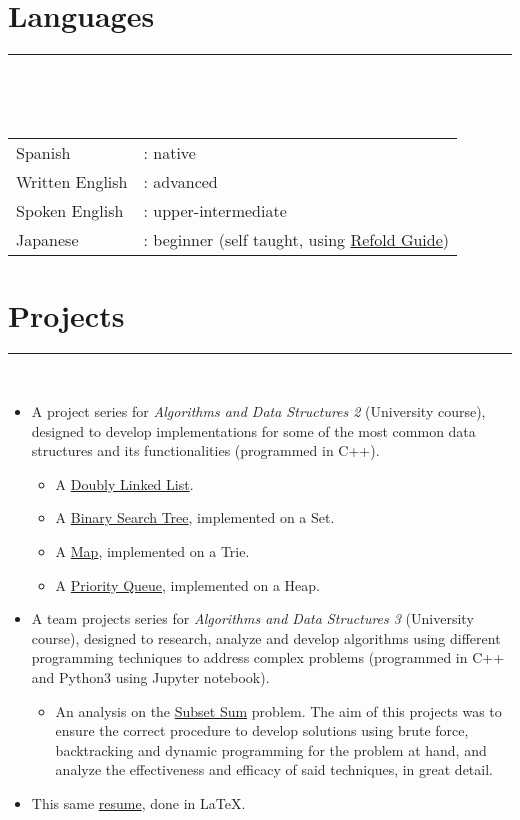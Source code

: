 \documentclass{article}
\begin{document}
\section*{Languages}
\hrule
\

\

\begin{tabular}{l l}
    Spanish & : native \\
    Written English & : advanced \\
    Spoken English & : upper-intermediate \\
    Japanese & : beginner (self taught, using \href{https://refold.la/}{Refold Guide})
\end{tabular}

\section*{Projects}
\hrule
\

\begin{itemize}
    \item A project series for \textit{Algorithms and Data Structures 2} (University course), designed to develop implementations for some of the most common data structures and its functionalities (programmed in C++).
    \begin{itemize}
        \item A \href{https://github.com/lucasDS-0/Doubly_Linked_List}{Doubly Linked List}.
        \item A \href{https://github.com/lucasDS-0/BST_on_a_set}{Binary Search Tree}, implemented on a Set.
        \item A \href{https://github.com/lucasDS-0/Map_on_a_trie}{Map}, implemented on a Trie.
        \item A \href{https://github.com/lucasDS-0/Priority_queue_on_a_heap}{Priority Queue}, implemented on a Heap.
    \end{itemize}
    \item A team projects series for \textit{Algorithms and Data Structures 3} (University course), designed to research, analyze and develop algorithms using different programming techniques to address complex problems (programmed in C++ and Python3 using Jupyter notebook).
    \begin{itemize}
        \item An analysis on the \href{https://github.com/lucasDS-0/Subset_sum}{Subset Sum} problem. The aim of this projects was to ensure the correct procedure to develop solutions using brute force, backtracking and dynamic programming for the problem at hand, and analyze the effectiveness and efficacy of said techniques, in great detail.
    \end{itemize}
    \item This same \href{https://github.com/lucasDS-0/Resume}{resume}, done in \LaTeX.
\end{itemize}
\end{document}
